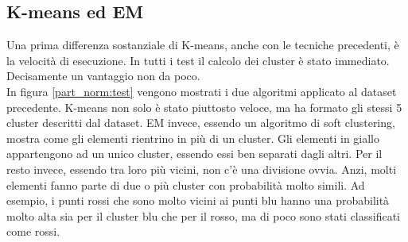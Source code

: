 \documentclass{llncs}
\newcommand{\acapo}{\vspace{0.5\baselineskip}\\}
\begin{document}
	\subsection{K-means ed EM}
	Una prima differenza sostanziale di K-means, anche con le tecniche precedenti, è la velocità di esecuzione. In tutti i test il calcolo dei cluster è stato immediato.
	Decisamente un vantaggio non da poco. 
	\acapo
	In figura \ref{part_norm:test} vengono mostrati i due algoritmi applicato al dataset precedente. K-means non solo è stato piuttosto veloce, ma ha formato gli stessi 5 cluster descritti dal dataset.
	EM invece, essendo un algoritmo di soft clustering, mostra come gli elementi rientrino in più di un cluster. Gli elementi in giallo appartengono ad un unico cluster, essendo essi ben separati dagli altri. 
	Per il resto invece, essendo tra loro più vicini, non c'è una divisione ovvia. Anzi, molti elementi fanno parte di due o più cluster con probabilità molto simili. 
	Ad esempio, i punti rossi che sono molto vicini ai punti blu hanno una probabilità molto alta sia per il cluster blu che per il rosso, ma di poco sono stati classificati come rossi.
\end{document}
